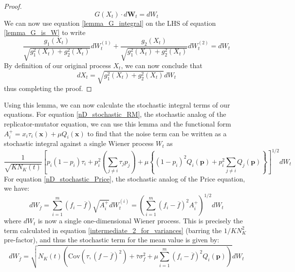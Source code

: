 \begin{proof}
\begin{equation}
	\label{lemma_G_is_W}
	G(X_t) \cdot d\mathbf{W}_t = dW_t
\end{equation}
We can now use equation \eqref{lemma_G_integral} on the LHS of equation \eqref{lemma_G_is_W} to write
\begin{equation}
	\frac{g_1(X_t)}{\sqrt{g_1^2(X_t) + g_2^2(X_t)}} dW^{(1)}_t + \frac{g_2(X_t)}{\sqrt{g_1^2(X_t) + g_2^2(X_t)}}dW^{(2)}_t = dW_t
\end{equation}
By definition of our original process $X_t$, we can now conclude that
\begin{equation}
	dX_t = \sqrt{g_1^2(X_t) + g_2^2(X_t)}dW_t
\end{equation}
thus completing the proof.
\end{proof}

Using this lemma, we can now calculate the stochastic integral terms of our equations. For equation \eqref{nD_stochastic_RM}, the stochastic analog of the replicator-mutator equation, we can use this lemma and the functional form $A_i^+ = x_i\tau_i(\mathbf{x}) + \mu Q_i(\mathbf{x})$ to find that the noise term can be written as a stochastic integral against a single Wiener process $W_t$ as
\begin{equation}
\label{nD_stoch_RM_noise_term_alt_representation}
\frac{1}{\sqrt{KN_{K}(t)}}\left[p_i(1-p_i)\tau_i + p_i^2\left(\sum\limits_{j\neq i}\tau_j p_j\right) + \mu\left\{(1-p_i)^2Q_i(\mathbf{p}) + p_i^2 \sum\limits_{j\neq i}Q_j(\mathbf{p})\right\}\right]^{1/2}dW_t
\end{equation}
For equation \eqref{nD_stochastic_Price}, the stochastic analog of the Price equation, we have:
\begin{equation}
dW_{\overline{f}} = \sum\limits_{i=1}^{m}\left(f_i-\overline{f}\right)\sqrt{A_i^+}dW_{t}^{(i)} = \left(\sum\limits_{i=1}^{m}\left(f_i-\overline{f}\right)^2A_i^+\right)^{1/2}dW_t
\end{equation}
where $dW_t$ is now a single one-dimensional Wiener process. This is precisely the term calculated in equation \eqref{intermediate_2_for_variances} (barring the $1/KN_K^2$ pre-factor), and thus the stochastic term for the mean value is given by:
\begin{equation}
	\label{nD_stoch_Price_noise_term_alt_representation}
	dW_{\overline{f}} = \sqrt{N_K(t) \left(\textrm{Cov}(\tau,\left(f - \overline{f}\right)^2) + \overline{\tau}\sigma^2_{f} +\mu \sum\limits_{i=1}^{m}\left(f_i - \overline{f}\right)^2Q_i(\mathbf{p})\right)}dW_t
\end{equation}

